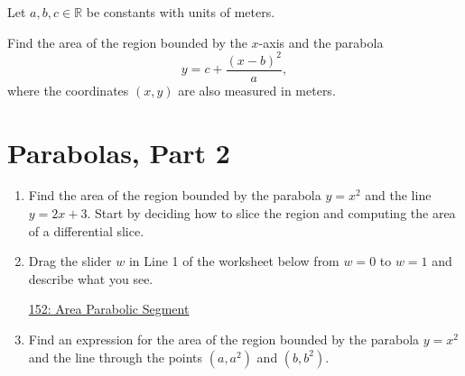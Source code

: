 \documentclass{ximera}
\begin{document}
\begin{question} \label{QPERer3943}
Let $a,b,c\in \mathbb{R}$ be constants with units of meters.

Find the area of the region bounded by the $x$-axis and the parabola
\[
      y = c+ \frac{(x-b)^2}{a} ,
\]
where the coordinates $(x,y)$ are also measured in meters.
\end{question}


\section{Parabolas, Part 2}

\begin{question} \label{QKdf3rr3}
\begin{enumerate}
\item Find the area of the region bounded by the parabola $y=x^2$ and the line $y=2x+3$. Start by deciding how to slice the region and computing the area of a differential slice.

\item Drag the slider $w$ in Line 1 of the worksheet below from $w=0$ to $w=1$ and describe what you see.

\begin{onlineOnly}
    \begin{center}
\end{center}
\end{onlineOnly}

\href{https://www.desmos.com/calculator/vci24vc4f1}{152: Area Parabolic Segment}

\item Find an expression for the area of the region bounded by the parabola $y=x^2$ and the line through the points $(a,a^2)$ and $(b,b^2)$.

\end{enumerate}
\end{question}
\end{document}
